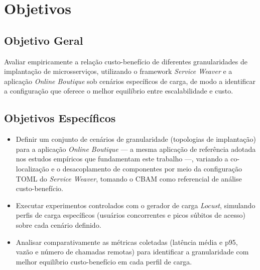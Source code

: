 \section{Objetivos}

\subsection{Objetivo Geral}

Avaliar empiricamente a relação custo-benefício de diferentes granularidades de implantação de microsserviços, utilizando o framework \textit{Service Weaver} e a aplicação \textit{Online Boutique} sob cenários específicos de carga, de modo a identificar a configuração que oferece o melhor equilíbrio entre escalabilidade e custo.

\subsection{Objetivos Específicos}

\begin{itemize}
    \item Definir um conjunto de cenários de granularidade (topologias de implantação) para a aplicação \textit{Online Boutique} \cite{mendonca2024serviceweaver, rego2025granularity} --- a mesma aplicação de referência adotada nos estudos empíricos que fundamentam este trabalho ---, variando a co-localização e o desacoplamento de componentes por meio da configuração TOML do \textit{Service Weaver}, tomando o CBAM como referencial de análise custo-benefício.
    \item Executar experimentos controlados com o gerador de carga \textit{Locust}, simulando perfis de carga específicos (usuários concorrentes e picos súbitos de acesso) sobre cada cenário definido.
    \item Analisar comparativamente as métricas coletadas (latência média e p95, vazão e número de chamadas remotas) para identificar a granularidade com melhor equilíbrio custo-benefício em cada perfil de carga.
\end{itemize}
